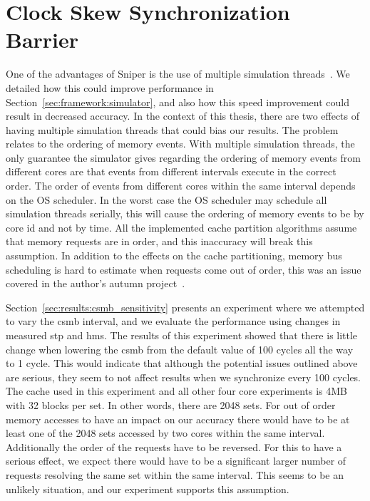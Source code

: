 \section{Clock Skew Synchronization Barrier}

One of the advantages of Sniper is the use of multiple simulation threads~\cite{Carlson2011a}.
We detailed how this could improve performance in Section~\ref{sec:framework:simulator}, and also how this speed improvement could result in decreased accuracy.
In the context of this thesis, there are two effects of having multiple
simulation threads that could bias our results.
The problem relates to the ordering of memory events.
With multiple simulation threads, the only guarantee the simulator gives regarding the ordering of memory events from different cores are that events from different intervals execute in the correct order.
The order of events from different cores within the same interval depends on the OS scheduler.
In the worst case the OS scheduler may schedule all simulation threads serially, this will cause the ordering of memory events to be by core id and not by time.
All the implemented cache partition algorithms assume that memory requests are in order, and this inaccuracy will break this assumption.
In addition to the effects on the cache partitioning, memory bus scheduling is hard to estimate when requests come out of order, this was an issue covered in the author's autumn project~\cite{Olsen2014}.

Section~\ref{sec:results:csmb_sensitivity} presents an experiment where we attempted to vary the \gls{csmb} interval, and we evaluate the performance using changes in measured \gls{stp} and \gls{hms}.
The results of this experiment showed that there is little change when lowering the \gls{csmb} from the default value of 100 cycles all the way to 1 cycle.
This would indicate that although the potential issues outlined above are serious, they seem to not affect results when we synchronize every 100 cycles.
The cache used in this experiment and all other four core experiments is 4MB with 32 blocks per set.
In other words, there are 2048 sets.
For out of order memory accesses to have an impact on our accuracy there would have to be at least one of the 2048 sets accessed by two cores within the same interval.
Additionally the order of the requests have to be reversed.
For this to have a serious effect, we expect there would have to be a significant larger number of requests resolving the same set within the same interval.
This seems to be an unlikely situation, and our experiment supports this assumption.

